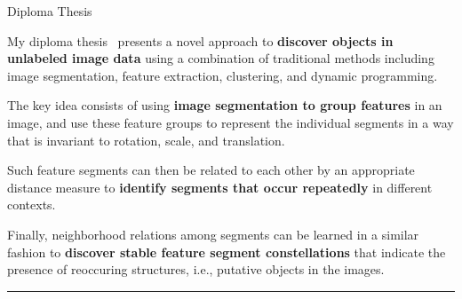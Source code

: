 


\begin{frame}{Diploma Thesis}

\justifying
My diploma thesis~\cite{Kerdels2006} presents a novel approach to {\bf discover 
objects in unlabeled image data} using a combination of traditional methods 
including image segmentation, feature extraction, clustering, and dynamic 
programming.

\vspace{1.5em}
The key idea consists of using {\bf image segmentation to group features} in an 
image, and use these feature groups to represent the individual segments in a 
way that is invariant to rotation, scale, and translation.

\vspace{1.5em}
Such feature segments can then be related to each other by an appropriate 
distance measure to {\bf identify segments that occur repeatedly} in different 
contexts.

\vspace{1.5em}
Finally, neighborhood relations among segments can be learned in a similar 
fashion to {\bf discover stable feature segment constellations} that indicate 
the presence of reoccuring structures, i.e., putative objects in the images.

\begin{center}
\rule{2cm}{0.4pt}\\[0.5em]
\end{center}


\end{frame}
